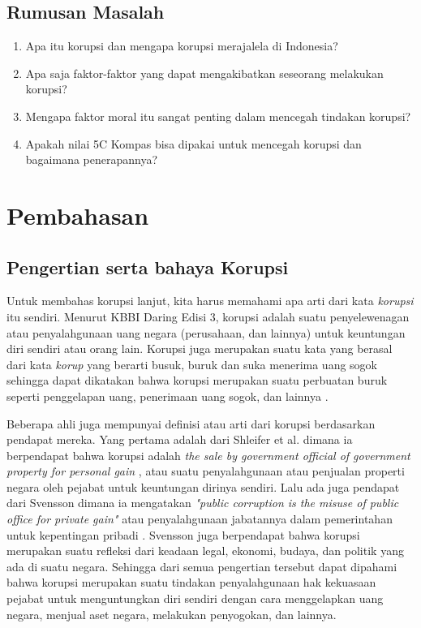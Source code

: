 \documentclass[11pt]{article}
\begin{document}
    \subsection{Rumusan Masalah}
    \begin{enumerate}
        \item Apa itu korupsi dan mengapa korupsi merajalela di Indonesia?
        \item Apa saja faktor-faktor yang dapat mengakibatkan seseorang melakukan
              korupsi?
        \item Mengapa faktor moral itu sangat penting dalam mencegah tindakan
              korupsi?
        \item Apakah nilai 5C Kompas bisa dipakai untuk mencegah korupsi 
              dan bagaimana penerapannya?
    \end{enumerate}

\newpage
\section{Pembahasan}
\subsection{Pengertian serta bahaya Korupsi}
Untuk membahas korupsi lanjut, kita harus memahami apa arti dari kata \emph{korupsi}
itu sendiri. Menurut KBBI Daring Edisi 3, korupsi adalah suatu penyelewenagan 
atau penyalahgunaan uang negara (perusahaan, dan lainnya) untuk keuntungan diri sendiri 
atau orang lain. Korupsi juga merupakan suatu kata yang berasal dari kata
\emph{korup} yang berarti busuk, buruk dan suka menerima uang sogok \citep{purwadarmintaKamusUmumBahasa1982} sehingga
dapat dikatakan bahwa korupsi merupakan suatu perbuatan buruk seperti penggelapan uang,
penerimaan uang sogok, dan lainnya \citep{setiadiKORUPSIDIINDONESIA2018}.

Beberapa ahli juga mempunyai definisi atau arti dari korupsi berdasarkan pendapat mereka.
Yang pertama adalah dari Shleifer et al. dimana ia berpendapat bahwa korupsi adalah
\emph{the sale by government official of government property for personal gain}
\citep{shleiferCorruption1993}, atau suatu penyalahgunaan atau penjualan properti
negara oleh pejabat untuk keuntungan dirinya sendiri. Lalu ada juga pendapat dari
Svensson dimana ia mengatakan \emph{"public corruption is the misuse of public
office for private gain"} atau penyalahgunaan jabatannya dalam pemerintahan untuk
kepentingan pribadi \cite[pg. 20]{svenssonEightQuestionsCorruption2005}.
Svensson juga berpendapat bahwa korupsi merupakan suatu refleksi dari keadaan
legal, ekonomi, budaya, dan politik yang ada di suatu negara. Sehingga dari 
semua pengertian tersebut dapat dipahami bahwa korupsi merupakan suatu tindakan
penyalahgunaan hak kekuasaan pejabat untuk menguntungkan diri sendiri dengan cara
menggelapkan uang negara, menjual aset negara, melakukan penyogokan, dan lainnya.
\end{document}
